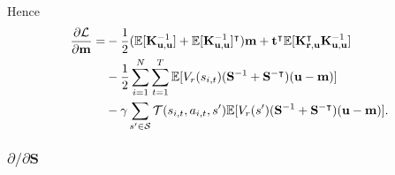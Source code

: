 \documentclass{mprop}
\theoremstyle{definition}
\begin{document}
Hence
\[
  \begin{split}
    \frac{\partial\mathcal{L}}{\partial\mathbf{m}} =
    &-\frac{1}{2}(\mathbb{E}[\mathbf{K}_{\mathbf{u},\mathbf{u}}^{-1}] +
    \mathbb{E}[\mathbf{K}_{\mathbf{u},\mathbf{u}}^{-1}]^\intercal)\mathbf{m} +
    \mathbf{t}^\intercal\mathbb{E}[\mathbf{K}_{\mathbf{r},\mathbf{u}}^\intercal\mathbf{K}_{\mathbf{u},\mathbf{u}}^{-1}] \\
    &- \frac{1}{2}\sum_{i=1}^N\sum_{t=1}^T \mathbb{E}[V_r(s_{i,t})
    (\mathbf{S}^{-1} + \mathbf{S}^{-\intercal})(\mathbf{u} - \mathbf{m})] \\
    &- \gamma\sum_{s' \in \mathcal{S}} \mathcal{T}(s_{i,t}, a_{i,t}, s')
    \mathbb{E}[V_r(s') (\mathbf{S}^{-1} + \mathbf{S}^{-\intercal})(\mathbf{u} -
    \mathbf{m})].
\end{split}
\]

\subsubsection{$\partial/\partial\mathbf{S}$}
\end{document}

